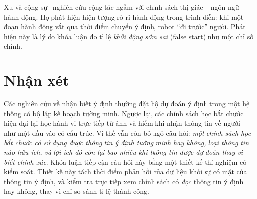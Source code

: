 Xu và cộng sự~\cite{xu2026learning} nghiên cứu cộng tác ngầm với chính sách thị giác -- ngôn ngữ -- hành động. Họ phát hiện hiện tượng rò rỉ hành động trong trình diễn: khi một đoạn hành động vắt qua thời điểm chuyển ý định, robot ``đi trước'' người. Phát hiện này là lý do khóa luận đo tỉ lệ \emph{khởi động sớm sai} (false start) như một chỉ số chính.

\section{Nhận xét}
\label{sec:related-gap}

Các nghiên cứu về nhận biết ý định thường đặt bộ dự đoán ý định trong một hệ thống có bộ lập kế hoạch tường minh. Ngược lại, các chính sách học bắt chước hiện đại lại học hành vi trực tiếp từ ảnh và hiếm khi nhận thông tin về người như một đầu vào có cấu trúc. Vì thế vẫn còn bỏ ngỏ câu hỏi: \emph{một chính sách học bắt chước có sử dụng được thông tin ý định tường minh hay không, loại thông tin nào hữu ích, và lợi ích đó còn lại bao nhiêu khi thông tin được dự đoán thay vì biết chính xác}. Khóa luận tiếp cận câu hỏi này bằng một thiết kế thí nghiệm có kiểm soát. Thiết kế này tách thời điểm phản hồi của dữ liệu khỏi sự có mặt của thông tin ý định, và kiểm tra trực tiếp xem chính sách có \emph{đọc} thông tin ý định hay không, thay vì chỉ so sánh tỉ lệ thành công.
